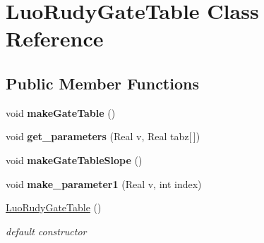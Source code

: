 \hypertarget{class_luo_rudy_gate_table}{
\section{LuoRudyGateTable Class Reference}
\label{class_luo_rudy_gate_table}
}
\subsection*{Public Member Functions}
\begin{DoxyCompactItemize}
\item 
\hypertarget{class_luo_rudy_gate_table_ab0f91d1a9aa84e22637ec189b8e7ca07}{
void {\bfseries makeGateTable} ()}
\label{class_luo_rudy_gate_table_ab0f91d1a9aa84e22637ec189b8e7ca07}

\item 
\hypertarget{class_luo_rudy_gate_table_ae0ed96c53d08ad0386a4dfd48c18a63d}{
void {\bfseries get\_\-parameters} (Real v, Real tabz\mbox{[}$\,$\mbox{]})}
\label{class_luo_rudy_gate_table_ae0ed96c53d08ad0386a4dfd48c18a63d}

\item 
\hypertarget{class_luo_rudy_gate_table_ac725e2ce8f5e5dda174a1669c71a39a5}{
void {\bfseries makeGateTableSlope} ()}
\label{class_luo_rudy_gate_table_ac725e2ce8f5e5dda174a1669c71a39a5}

\item 
\hypertarget{class_luo_rudy_gate_table_abfc3aded5ab046ab894beb3c38ab39c1}{
void {\bfseries make\_\-parameter1} (Real v, int index)}
\label{class_luo_rudy_gate_table_abfc3aded5ab046ab894beb3c38ab39c1}

\item 
\hypertarget{class_luo_rudy_gate_table_ae348e42f14e8088001610bd064907e4d}{
\hyperlink{class_luo_rudy_gate_table_ae348e42f14e8088001610bd064907e4d}{LuoRudyGateTable} ()}
\label{class_luo_rudy_gate_table_ae348e42f14e8088001610bd064907e4d}

\begin{DoxyCompactList}\small\item\em default constructor \item\end{DoxyCompactList}\end{DoxyCompactItemize}
